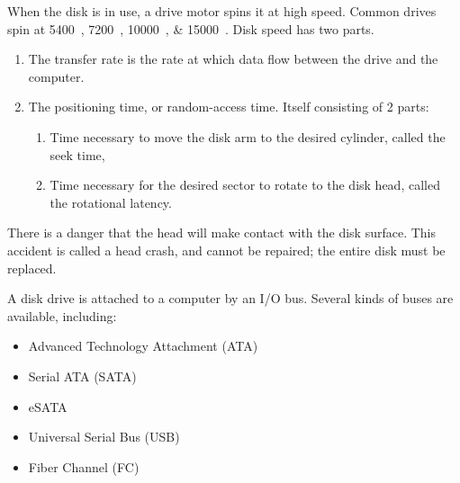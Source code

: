 When the disk is in use, a drive motor spins it at high speed.
Common drives spin at \SIlist{5400; 7200; 10000; 15000}{\rpm}.
Disk speed has two parts.
\begin{enumerate}[noitemsep]
\item The transfer rate is the rate at which data flow between the drive and the computer.
\item The positioning time, or random-access time. Itself consisting of 2 parts:
  \begin{enumerate}[noitemsep]
  \item Time necessary to move the disk arm to the desired cylinder, called the seek time,
  \item Time necessary for the desired sector to rotate to the disk head, called the rotational latency.
  \end{enumerate}
\end{enumerate}

There is a danger that the head will make contact with the disk surface.
This accident is called a head crash, and cannot be repaired; the entire disk must be replaced.

A disk drive is attached to a computer by an I/O bus.
Several kinds of buses are available, including:
\begin{itemize}[noitemsep]
\item Advanced Technology Attachment (ATA)
\item Serial ATA (SATA)
\item eSATA
\item Universal Serial Bus (USB)
\item Fiber Channel (FC)
\end{itemize}


